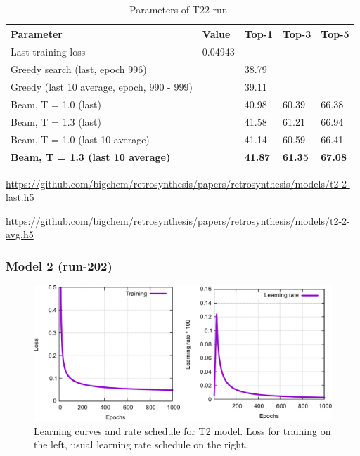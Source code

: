 \documentclass{article}
\begin{document}
\begin{table}[h!]
\caption{Parameters of T22 run.}
  \centering
  \begin{tabular}{p{8.2cm}p{1.5cm}p{1.5cm}p{1.5cm}p{1.5cm}}
    \toprule
    Parameter & Value & Top-1 & Top-3 & Top-5 \\
    \midrule
    Last training loss & 0.04943 & & & \\
    \midrule
    Greedy search (last, epoch 996) & & 38.79 & & \\
    Greedy (last 10 average, epoch, 990 - 999) & & 39.11 & & \\
    \midrule
    Beam, T = 1.0 (last) & & 40.98 & 60.39 & 66.38  \\
    Beam, T = 1.3 (last) & & 41.58 &  61.21 & 66.94 \\ 
    \midrule
    Beam, T = 1.0 (last 10 average) & & 41.14  & 60.59 &  66.41\\
    \textbf{Beam, T = 1.3 (last 10 average)} & &  \textbf{41.87} &  \textbf{61.35} &  \textbf{67.08}\\ 
    \bottomrule
  \end{tabular}
  \label{tbl:t11}

\end{table} 

\url{https://github.com/bigchem/retrosynthesis/papers/retrosynthesis/models/t2-2-last.h5}

\url{https://github.com/bigchem/retrosynthesis/papers/retrosynthesis/models/t2-2-avg.h5}

\newpage
 \subsubsection{Model 2 (run-202)}
 
\begin{figure}[h!]
  \centering
  \includegraphics[width = 16.5cm]{images/t2-3.pdf}
  \caption{Learning curves and rate schedule for T2 model. Loss for training on the left, usual learning rate schedule on the right.}
  \label{fig:t21}
\end{figure}
\end{document}
